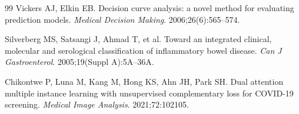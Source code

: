 \documentclass[11pt]{article}
\begin{document}
\begin{thebibliography}{99}
Vickers AJ, Elkin EB.
Decision curve analysis: a novel method for evaluating prediction models.
\textit{Medical Decision Making}. 2006;26(6):565--574.

Silverberg MS, Satsangi J, Ahmad T, et al.
Toward an integrated clinical, molecular and serological classification of inflammatory bowel disease.
\textit{Can J Gastroenterol}. 2005;19(Suppl A):5A--36A.

Chikontwe P, Luna M, Kang M, Hong KS, Ahn JH, Park SH.
Dual attention multiple instance learning with unsupervised complementary loss for COVID-19 screening.
\textit{Medical Image Analysis}. 2021;72:102105.

\end{thebibliography}
\end{document}
